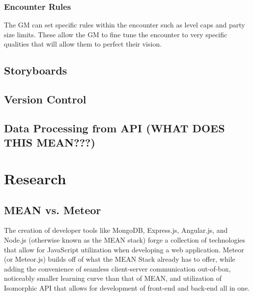 \documentclass[12pt,a4paper]{report}
\begin{document}
		\subsection{Encounter Rules}
		The GM can set specific rules within the encounter such as level caps and party size limits. These allow the GM to fine tune the encounter to very specific qualities that will allow them to perfect their vision. 
		
	\section{Storyboards}
	\section{Version Control}
	\section{Data Processing from API (WHAT DOES THIS MEAN???)}

\newpage
\chapter*{Research}
	\section{MEAN vs. Meteor}
	The creation of developer tools like MongoDB, Express.js, Angular.js, and Node.js (otherwise known as the MEAN stack) forge a collection of technologies that allow for JavaScript utilization when developing a web application. Meteor (or Meteor.js) builds off of what the MEAN Stack already has to offer, while adding the convenience of seamless client-server communication out-of-box, noticeably smaller learning curve than that of MEAN, and utilization of Isomorphic API that allows for development of front-end and back-end all in one.
	
\end{document}
